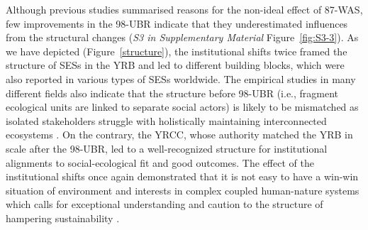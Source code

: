Although previous studies summarised reasons for the non-ideal effect of 87-WAS, few improvements in the 98-UBR indicate that they underestimated influences from the structural changes (\textit{S3 in Supplementary Material} Figure~\ref{fig:S3-3}).
As we have depicted (Figure~\ref{structure}), the institutional shifts twice framed the structure of SESs in the YRB and led to different building blocks, which were also reported in various types of SESs worldwide.
The empirical studies in many different fields also indicate that the structure before 98-UBR (i.e., fragment ecological units are linked to separate social actors) is likely to be mismatched as isolated stakeholders struggle with holistically maintaining interconnected ecosystems
\cite{sayles2017,sayles2019,cai2016,bergsten2019}.
On the contrary, the YRCC, whose authority matched the YRB in scale after the 98-UBR, led to a well-recognized structure for institutional alignments to social-ecological fit and good outcomes.
The effect of the institutional shifts once again demonstrated that it is not easy to have a win-win situation of environment and interests in complex coupled human-nature systems \cite{hegwood2022} which calls for exceptional understanding and caution to the structure of hampering sustainability \cite{bergsten2019, sayles2019}.

